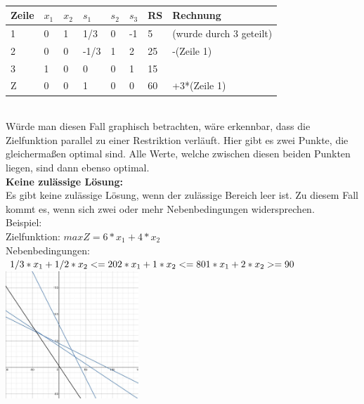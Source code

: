 \\
\begin{table}[!ht]
\begin{tabular}{|l|l|l|l|l|l|l|l|}
\hline
\rowcolor[HTML]{C0C0C0} 
Zeile                     & $x_1$ & $x_2$ & $s_1$   & $s_2$ & $s_3$ & RS & Rechnung                \\ \hline
\rowcolor[HTML]{FFFFFF} 
\cellcolor[HTML]{C0C0C0}1 & 0  & 1  & 1/3  & 0  & -1 & 5  & (wurde durch 3 geteilt) \\ \hline
\rowcolor[HTML]{FFFFFF} 
\cellcolor[HTML]{C0C0C0}2 & 0  & 0  & -1/3 & 1  & 2  & 25 & -(Zeile 1)              \\ \hline
\rowcolor[HTML]{FFFFFF} 
\cellcolor[HTML]{C0C0C0}3 & 1  & 0  & 0    & 0  & 1  & 15 &                         \\ \hline
\rowcolor[HTML]{FFFFFF} 
\cellcolor[HTML]{C0C0C0}Z & 0  & 0  & 1    & 0  & 0  & 60 & +3*(Zeile 1)            \\ \hline
\end{tabular}
\end{table}
\\
Würde man diesen Fall graphisch betrachten, wäre erkennbar, dass die Zielfunktion parallel zu einer Restriktion verläuft. Hier gibt es zwei Punkte, die gleichermaßen optimal sind. Alle Werte, welche zwischen diesen beiden Punkten liegen, sind dann ebenso optimal.\\
\textbf{Keine zulässige Lösung: }\\
Es gibt keine zulässige Lösung, wenn der zulässige Bereich leer ist. Zu diesem Fall kommt es, wenn sich zwei oder mehr Nebenbedingungen widersprechen.\\
Beispiel:\\
Zielfunktion: \begin{math}max Z = 6*x_1+4*x_2\end{math}\\
Nebenbedingungen:\\
\begin{math}
1/3*x_1+1/2*x_2 <= 20\\
2*x_1+1*x_2 <= 80\\
1*x_1+2*x_2 >= 90\\
\end{math}
\includegraphics[width = 5cm, right]{images/IMG_keine_Losung.jpeg}
